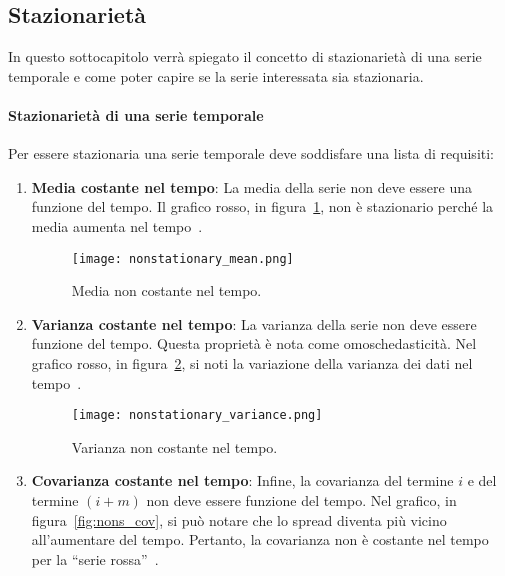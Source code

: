 \subsection{Stazionarietà}
In questo sottocapitolo verrà spiegato il concetto di stazionarietà di una serie
temporale e come poter capire se la serie interessata sia stazionaria.
 
\paragraph{Stazionarietà di una serie temporale}
Per essere stazionaria una serie temporale deve soddisfare
una lista di requisiti:
\begin{enumerate}
    
    \item \textbf{Media costante nel tempo}: La media della serie non deve essere 
    una funzione del tempo. Il grafico rosso, in figura~\ref{fig:nons_mean}, non è stazionario 
    perché la media aumenta nel tempo~\cite{sa:stationary}.

    \begin{figure}[H]
        \centering
        \texttt{[image: nonstationary\_mean.png]}
        \caption{Media non costante nel tempo.}
        \label{fig:nons_mean}
    \end{figure}


    \item \textbf{Varianza costante nel tempo}: La varianza della serie non deve 
    essere funzione del tempo. Questa proprietà è nota come omoschedasticità. 
    Nel grafico rosso, in figura~\ref{fig:nons_var}, 
    si noti la variazione della varianza dei dati nel tempo~\cite{sa:stationary}.

    \begin{figure}[H]
        \centering
        \texttt{[image: nonstationary\_variance.png]}
        \caption{Varianza non costante nel tempo.}
        \label{fig:nons_var}
    \end{figure}

    \item \textbf{Covarianza costante nel tempo}: Infine, la covarianza del 
    termine $i$ e del termine $(i + m)$ non deve essere funzione del tempo. 
    Nel grafico, in figura~\ref{fig:nons_cov}, si può notare che lo spread 
    diventa più vicino all'aumentare del tempo. Pertanto, 
    la covarianza non è costante nel tempo per la ``serie rossa''~\cite{sa:stationary}.


\end{enumerate}
